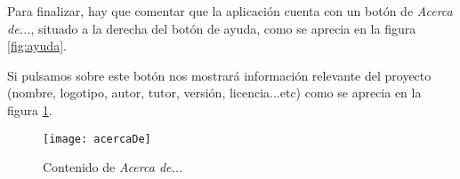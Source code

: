 Para finalizar, hay que comentar que la aplicación cuenta con un botón de \emph{Acerca de...}, situado a la derecha del botón de ayuda, como se aprecia en la figura \ref{fig:ayuda}.

Si pulsamos sobre este botón nos mostrará información relevante del proyecto (nombre, logotipo, autor, tutor, versión, licencia...etc) como se aprecia en la figura \ref{fig:acercaDe}.

\begin{figure}%
		\centering
		\texttt{[image: acercaDe]}
		\caption{Contenido de \emph{Acerca de...}}\label{fig:acercaDe}
	\end{figure}